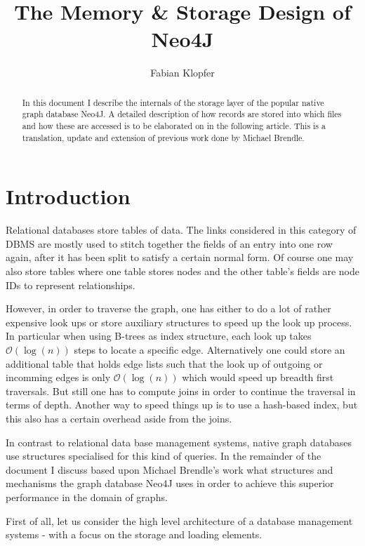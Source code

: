 \documentclass[a4paper,10pt]{article}
\title{The Memory \& Storage Design of Neo4J}
\author{Fabian Klopfer}
\begin{document}
\maketitle

\begin{abstract}
In this document I describe the internals of the storage layer of the popular native graph database Neo4J. A detailed description of how records are stored into which files and how these are accessed is to be elaborated on in the following article. This is a translation, update and extension of previous work done by Michael Brendle. 
\end{abstract}



\section{Introduction}
Relational databases store tables of data. The links considered in this category of DBMS are mostly used to stitch together the fields of an entry into one row again, after it has been split to satisfy a certain normal form. Of course one may also store tables where one table stores nodes and the other table's fields are node IDs to represent relationships.

However, in order to traverse the graph, one has either to do a lot of rather expensive look ups or store auxiliary structures to speed up the look up process. In particular when using B-trees as index structure, each look up takes $\mathcal{O}(\log(n))$ steps to locate a specific edge. Alternatively one could store an additional table that holds edge lists such that the look up of outgoing or incomming edges is only $\mathcal{O}(\log(n))$ which would speed up breadth first traversals. But still one has to compute joins in order to continue the traversal in terms of depth. Another way to speed things up is to use a hash-based index, but this also has a certain overhead aside from the joins.

In contrast to relational data base management systems, native graph databases use structures specialised for this kind of queries. In the remainder of the document I discuss based upon Michael Brendle's work what structures and mechanisms the graph database Neo4J uses in order to achieve this superior performance in the domain of graphs.

First of all, let us consider the high level architecture of a database management systems - with a focus on the storage and loading elements.
\end{document}
